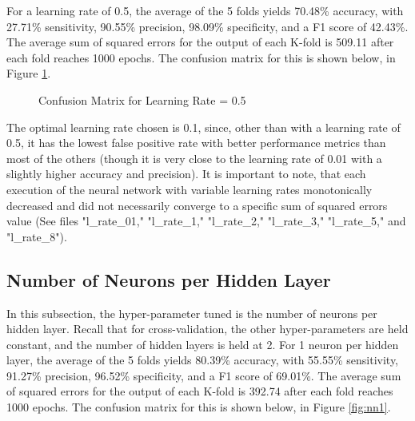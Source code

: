 \documentclass[tikz]{article}
\begin{document}
For a learning rate of 0.5, the average of the 5 folds yields 70.48\% accuracy, with 27.71\% sensitivity, 90.55\% precision, 98.09\% specificity, and a F1 score of 42.43\%. The average sum of squared errors for the output of each K-fold is 509.11 after each fold reaches 1000 epochs. The confusion matrix for this is shown below, in Figure \ref{fig:l5}.


\begin{figure}[H]
\begin{center}
\caption{Confusion Matrix for Learning Rate = 0.5}
\label{fig:l5}
\end{center}
\end{figure}

The optimal learning rate chosen is 0.1, since, other than with a learning rate of 0.5, it has the lowest false positive rate with better performance metrics than most of the others (though it is very close to the learning rate of 0.01 with a slightly higher accuracy and precision). It is important to note, that each execution of the neural network with variable learning rates monotonically decreased and did not necessarily converge to a specific sum of squared errors value (See files "l\_rate\_01," "l\_rate\_1," "l\_rate\_2," "l\_rate\_3," "l\_rate\_5," and "l\_rate\_8").

\subsection{Number of Neurons per Hidden Layer}
\label{sec:hyper2}
In this subsection, the hyper-parameter tuned is the number of neurons per hidden layer. Recall that for cross-validation, the other hyper-parameters are held constant, and the number of hidden layers is held at 2. For 1 neuron per hidden layer, the average of the 5 folds yields 80.39\% accuracy, with 55.55\% sensitivity, 91.27\% precision, 96.52\% specificity, and a F1 score of 69.01\%. The average sum of squared errors for the output of each K-fold is 392.74 after each fold reaches 1000 epochs. The confusion matrix for this is shown below, in Figure \ref{fig:nn1}.
\end{document}
